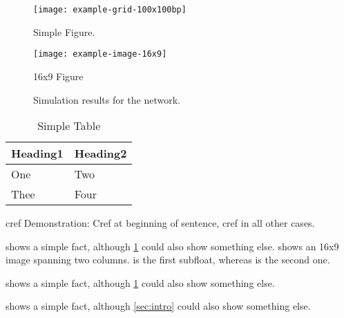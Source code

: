 \documentclass[conference]{IEEEtran}[2015/08/26]
\begin{document}
\begin{figure}
  \texttt{[image: example-grid-100x100bp]}
  \caption{Simple Figure. \cite[based on][]{mwe}}
  \label{fig:simple}
\end{figure}

\begin{figure*}
  \centering
  \texttt{[image: example-image-16x9]}
  \caption{16x9 Figure}
  \label{fig:16x9}
\end{figure*}

\begin{figure*}[!b]
  \centering
  \hfil
  \caption{Simulation results for the network.}
  \label{fig_sim}
\end{figure*}

\begin{table}
  \caption{Simple Table}
  \label{tab:simple}
  \centering
  \begin{tabular}{ll}
    \toprule
    Heading1 & Heading2 \\
    \midrule
    One      & Two      \\
    Thee     & Four     \\
    \bottomrule
  \end{tabular}
\end{table}

cref Demonstration: Cref at beginning of sentence, cref in all other cases.

 shows a simple fact, although \cref{fig:simple} could also show something else.
 shows an 16x9 image spanning two columns.
 is the first subfloat, whereas  is the second one.

 shows a simple fact, although \cref{tab:simple} could also show something else.

 shows a simple fact, although \cref{sec:intro} could also show something else.
\end{document}
